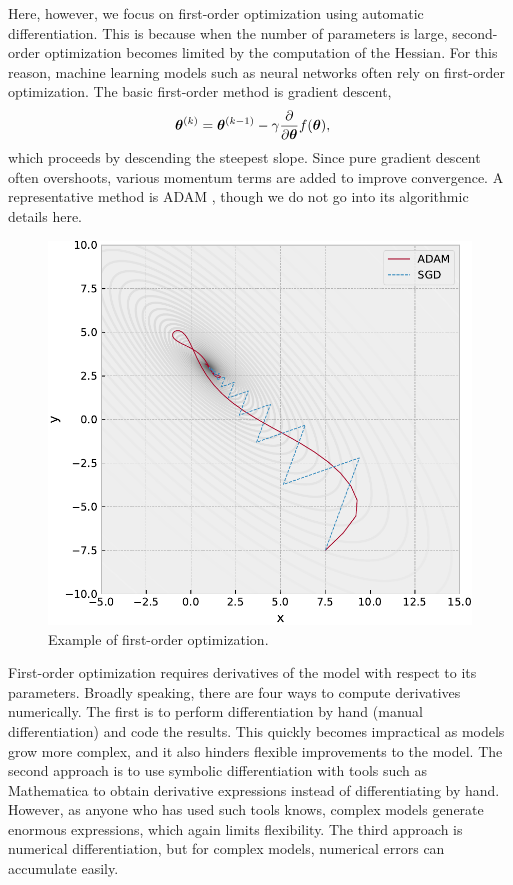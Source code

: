 Here, however, we focus on first-order optimization using automatic differentiation. This is because when the number of parameters is large, second-order optimization becomes limited by the computation of the Hessian. For this reason, machine learning models such as neural networks often rely on first-order optimization. The basic first-order method is gradient descent,
\begin{align}
\boldsymbol{\theta}^{(k)} &= \boldsymbol{\theta}^{(k-1)} - \gamma \frac{\partial}{\partial \boldsymbol{\theta}} f(\boldsymbol{\theta}) ,
\end{align}
which proceeds by descending the steepest slope. Since pure gradient descent often overshoots, various momentum terms are added to improve convergence. A representative method is ADAM \cite{kingma2015adam}, though we do not go into its algorithmic details here.

\begin{figure}[htb]
\begin{center}
\includegraphics[width=\linewidth]{fig/opt1.pdf}
\caption{Example of first-order optimization.\label{fig:opt1}}
\end{center}
\end{figure}

First-order optimization requires derivatives of the model with respect to its parameters. Broadly speaking, there are four ways to compute derivatives numerically. The first is to perform differentiation by hand (manual differentiation) and code the results. This quickly becomes impractical as models grow more complex, and it also hinders flexible improvements to the model. The second approach is to use symbolic differentiation with tools such as Mathematica to obtain derivative expressions instead of differentiating by hand. However, as anyone who has used such tools knows, complex models generate enormous expressions, which again limits flexibility. The third approach is numerical differentiation, but for complex models, numerical errors can accumulate easily.

